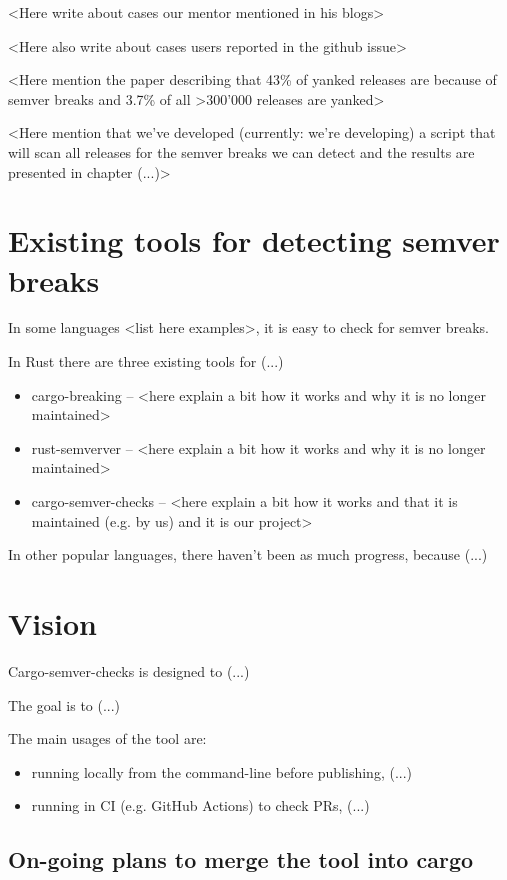 \documentclass[licencjacka,en]{pracamgr}
\begin{document}
<Here write about cases our mentor mentioned in his blogs>

<Here also write about cases users reported in the github issue>

<Here mention the paper describing that 43\% of yanked releases
are because of semver breaks and 3.7\% of all >300'000 releases are yanked>

<Here mention that we've developed (currently: we're developing)
a script that will scan all releases for the semver breaks
we can detect and the results are presented in chapter (...)>

\chapter{Existing tools for detecting semver breaks}\label{r:idk}

In some languages <list here examples>, it is easy to check for semver breaks.

In Rust there are three existing tools for (...)
\begin{itemize}
	\item cargo-breaking -- <here explain a bit how it works and why it is no longer maintained>
	\item rust-semverver -- <here explain a bit how it works and why it is no longer maintained>
	\item cargo-semver-checks -- <here explain a bit how it works and that it is maintained (e.g. by us) and it is our project>
\end{itemize}

In other popular languages, there haven't been as much progress, because (...)

\chapter{Vision}\label{r:idk}

Cargo-semver-checks is designed to (...)

The goal is to (...)

The main usages of the tool are:
\begin{itemize}
	\item running locally from the command-line before publishing, (...)
	\item running in CI (e.g. GitHub Actions) to check PRs, (...)
\end{itemize}

\section{On-going plans to merge the tool into cargo}
\end{document}

